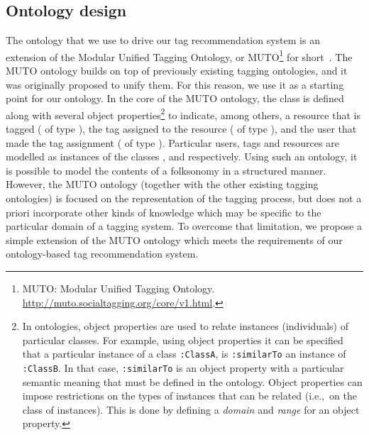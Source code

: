 \subsection{Ontology design}
\label{sec:ontology:design}
The ontology that we use to drive our tag recommendation system is an extension of the Modular Unified Tagging Ontology, or MUTO\footnote{MUTO: Modular Unified Tagging Ontology. \url{http://muto.socialtagging.org/core/v1.html}.} for short~\citep{Lohmann2011}.
The MUTO ontology builds on top of previously existing tagging ontologies, and it was originally proposed to unify them. 
For this reason, we use it as a starting point for our ontology. 
In the core of the MUTO ontology, the  class is defined along with several object properties\footnote{In ontologies, object properties are used to relate instances (individuals) of particular classes. For example, using object properties it can be specified that a particular instance of a class \texttt{:ClassA}, is \texttt{:similarTo} an instance of \texttt{:ClassB}. In that case, \texttt{:similarTo} is an object property with a particular semantic meaning that must be defined in the ontology. Object properties can impose restrictions on the types of instances that can be related (i.e.,~on the class of instances). This is done by defining a \emph{domain} and \emph{range} for an object property.} to indicate, among others, a resource that is tagged ( of type ), the tag assigned to the resource ( of type ), and the user that made the tag assignment ( of type ). Particular users, tags and resources are modelled as instances of the classes ,  and  respectively.
Using such an ontology, it is possible to model the contents of a folksonomy in a structured manner.
However, the MUTO ontology (together with the other existing tagging ontologies) is focused on the representation of the tagging process, but does not a priori incorporate other kinds of knowledge which may be specific to the particular domain of a tagging system.
To overcome that limitation, we propose a simple extension of the MUTO ontology which meets the requirements of our ontology-based tag recommendation system. 

